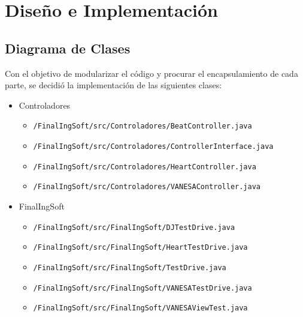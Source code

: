 \documentclass[10pt]{article} %
\begin{document}


\section{Diseño e Implementación}

\subsection{Diagrama de Clases}
Con el objetivo de modularizar el código y procurar el encapsulamiento de cada parte, se decidió la implementación de las siguientes clases:
\begin{itemize}
\item Controladores
  \begin{itemize}
    \item \verb+/FinalIngSoft/src/Controladores/BeatController.java+
    \item \verb+/FinalIngSoft/src/Controladores/ControllerInterface.java+
    \item \verb+/FinalIngSoft/src/Controladores/HeartController.java+
    \item \verb+/FinalIngSoft/src/Controladores/VANESAController.java+
  \end{itemize}

\item FinalIngSoft
  \begin{itemize}
    \item \verb+/FinalIngSoft/src/FinalIngSoft/DJTestDrive.java+
    \item \verb+/FinalIngSoft/src/FinalIngSoft/HeartTestDrive.java+
    \item \verb+/FinalIngSoft/src/FinalIngSoft/TestDrive.java+
    \item \verb+/FinalIngSoft/src/FinalIngSoft/VANESATestDrive.java+
    \item \verb+/FinalIngSoft/src/FinalIngSoft/VANESAViewTest.java+
  \end{itemize}


\end{itemize}
\end{document}
